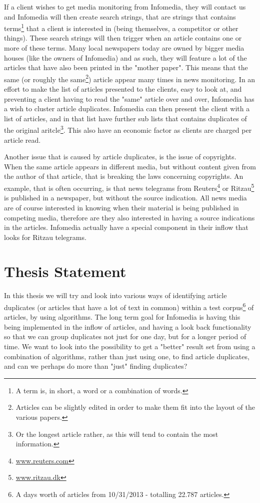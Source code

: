 If a client wishes to get media monitoring from Infomedia, they will contact us and Infomedia will then create search strings, that are strings that contains terms\footnote{A term is, in short, a word or a combination of words.} that a client is interested in (being themselves, a competitor or other things). These search strings will then trigger when an article contains one or more of these terms.
Many local newspapers today are owned by bigger media houses (like the owners of Infomedia) and as such, they will feature a lot of the articles that have also been printed in the "mother paper". This means that the same (or roughly the same\footnote{Articles can be slightly edited in order to make them fit into the layout of the various papers.}) article appear many times in news monitoring. In an effort to make the list of articles presented to the clients, easy to look at, and preventing a client having to read the "same" article over and over, Infomedia has a wish to cluster article duplicates. Infomedia can then present the client with a list of articles, and in that list have further sub lists that contains duplicates of the original aritcle\footnote{Or the longest article rather, as this will tend to contain the most information.}. This also have an economic factor as clients are charged per article read.

Another issue that is caused by article duplicates, is the issue of copyrights. When the same article appears in different media, but without content given from the author of that article, that is breaking the laws concerning copyrights. An example, that is often occurring, is that news telegrams from Reuters\footnote{\url{www.reuters.com}} or Ritzau\footnote{\url{www.ritzau.dk}} is published in a newspaper, but without the source indication. All news media are of course interested in knowing when their material is being published in competing media, therefore are they also interested in having a source indications in the articles. Infomedia actually have a special component in their inflow that looks for Ritzau telegrams.

\section{Thesis Statement}

In this thesis we will try and look into various ways of identifying article duplicates (or articles that have a lot of text in common) within a test corpus\footnote{A days worth of articles from 10/31/2013 - totalling 22.787 articles.} of articles, by using algorithms. The long term goal for Infomedia is having this being implemented in the inflow of articles, and having a look back functionality so that we can group duplicates not just for one day, but for a longer period of time. We want to look into the possibility to get a "better" result set from using a combination of algorithms, rather than just using one, to find article duplicates, and can we perhaps do more than "just" finding duplicates?

